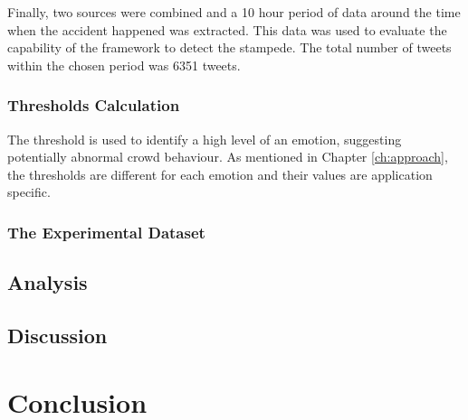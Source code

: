 Finally, two sources were combined and a 10 hour period of data around the time when the accident happened was extracted. This data was used to evaluate the capability of the framework to detect the stampede. The total number of tweets within the chosen period was 6351 tweets.

\subsubsection{Thresholds Calculation}
The threshold is used to identify a high level of an emotion, suggesting potentially abnormal crowd behaviour. As mentioned in Chapter \ref{ch:approach}, the thresholds are different for each emotion and their values are application specific.

\subsubsection{The Experimental Dataset}

\subsection{Analysis}

\subsection{Discussion}

\section{Conclusion}